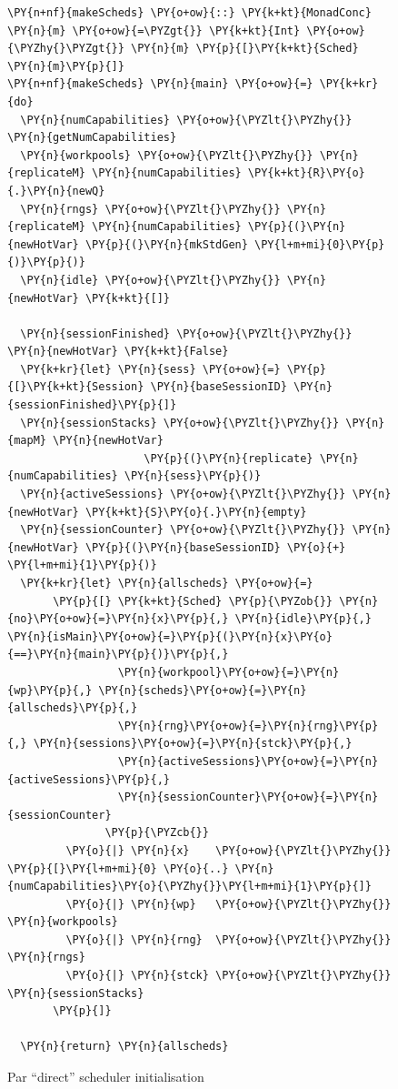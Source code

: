 \begin{figure}[t]
\begin{minipage}[t]{0.49\textwidth}

\begin{Verbatim}[commandchars=\\\{\}]
\PY{n+nf}{makeScheds} \PY{o+ow}{::} \PY{k+kt}{MonadConc} \PY{n}{m} \PY{o+ow}{=\PYZgt{}} \PY{k+kt}{Int} \PY{o+ow}{\PYZhy{}\PYZgt{}} \PY{n}{m} \PY{p}{[}\PY{k+kt}{Sched} \PY{n}{m}\PY{p}{]}
\PY{n+nf}{makeScheds} \PY{n}{main} \PY{o+ow}{=} \PY{k+kr}{do}
  \PY{n}{numCapabilities} \PY{o+ow}{\PYZlt{}\PYZhy{}} \PY{n}{getNumCapabilities}
  \PY{n}{workpools} \PY{o+ow}{\PYZlt{}\PYZhy{}} \PY{n}{replicateM} \PY{n}{numCapabilities} \PY{k+kt}{R}\PY{o}{.}\PY{n}{newQ}
  \PY{n}{rngs} \PY{o+ow}{\PYZlt{}\PYZhy{}} \PY{n}{replicateM} \PY{n}{numCapabilities} \PY{p}{(}\PY{n}{newHotVar} \PY{p}{(}\PY{n}{mkStdGen} \PY{l+m+mi}{0}\PY{p}{)}\PY{p}{)}
  \PY{n}{idle} \PY{o+ow}{\PYZlt{}\PYZhy{}} \PY{n}{newHotVar} \PY{k+kt}{[]}

  \PY{n}{sessionFinished} \PY{o+ow}{\PYZlt{}\PYZhy{}} \PY{n}{newHotVar} \PY{k+kt}{False}
  \PY{k+kr}{let} \PY{n}{sess} \PY{o+ow}{=} \PY{p}{[}\PY{k+kt}{Session} \PY{n}{baseSessionID} \PY{n}{sessionFinished}\PY{p}{]}
  \PY{n}{sessionStacks} \PY{o+ow}{\PYZlt{}\PYZhy{}} \PY{n}{mapM} \PY{n}{newHotVar}
                     \PY{p}{(}\PY{n}{replicate} \PY{n}{numCapabilities} \PY{n}{sess}\PY{p}{)}
  \PY{n}{activeSessions} \PY{o+ow}{\PYZlt{}\PYZhy{}} \PY{n}{newHotVar} \PY{k+kt}{S}\PY{o}{.}\PY{n}{empty}
  \PY{n}{sessionCounter} \PY{o+ow}{\PYZlt{}\PYZhy{}} \PY{n}{newHotVar} \PY{p}{(}\PY{n}{baseSessionID} \PY{o}{+} \PY{l+m+mi}{1}\PY{p}{)}
  \PY{k+kr}{let} \PY{n}{allscheds} \PY{o+ow}{=}
       \PY{p}{[} \PY{k+kt}{Sched} \PY{p}{\PYZob{}} \PY{n}{no}\PY{o+ow}{=}\PY{n}{x}\PY{p}{,} \PY{n}{idle}\PY{p}{,} \PY{n}{isMain}\PY{o+ow}{=}\PY{p}{(}\PY{n}{x}\PY{o}{==}\PY{n}{main}\PY{p}{)}\PY{p}{,}
                 \PY{n}{workpool}\PY{o+ow}{=}\PY{n}{wp}\PY{p}{,} \PY{n}{scheds}\PY{o+ow}{=}\PY{n}{allscheds}\PY{p}{,}
                 \PY{n}{rng}\PY{o+ow}{=}\PY{n}{rng}\PY{p}{,} \PY{n}{sessions}\PY{o+ow}{=}\PY{n}{stck}\PY{p}{,}
                 \PY{n}{activeSessions}\PY{o+ow}{=}\PY{n}{activeSessions}\PY{p}{,}
                 \PY{n}{sessionCounter}\PY{o+ow}{=}\PY{n}{sessionCounter}
               \PY{p}{\PYZcb{}}
         \PY{o}{|} \PY{n}{x}    \PY{o+ow}{\PYZlt{}\PYZhy{}} \PY{p}{[}\PY{l+m+mi}{0} \PY{o}{..} \PY{n}{numCapabilities}\PY{o}{\PYZhy{}}\PY{l+m+mi}{1}\PY{p}{]}
         \PY{o}{|} \PY{n}{wp}   \PY{o+ow}{\PYZlt{}\PYZhy{}} \PY{n}{workpools}
         \PY{o}{|} \PY{n}{rng}  \PY{o+ow}{\PYZlt{}\PYZhy{}} \PY{n}{rngs}
         \PY{o}{|} \PY{n}{stck} \PY{o+ow}{\PYZlt{}\PYZhy{}} \PY{n}{sessionStacks}
       \PY{p}{]}

  \PY{n}{return} \PY{n}{allscheds}
\end{Verbatim}
    \caption*{\dejafu{}}
  \end{minipage}
  \caption{Par ``direct'' scheduler initialisation\\\hrulefill}
  \label{fig:dejafu-example-parmonad-sched}
\end{figure}
\captionsetup[figure]{format=underlined}


